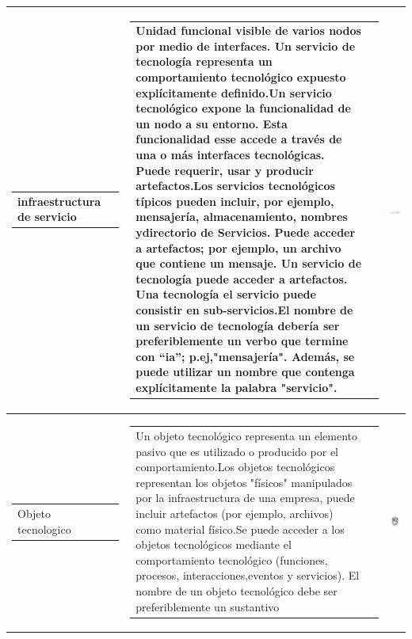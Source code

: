 \begin{longtable}{|c|c|c|}
	\begin{tabular}{p{2cm}p{3cm}}
		infraestructura de servicio  
	\end{tabular}
	&
	\begin{tabular}{p{8cm}p{3cm}} 
		Unidad funcional visible de varios nodos por medio de interfaces.
		Un servicio de tecnología representa un comportamiento tecnológico expuesto explícitamente definido.Un servicio tecnológico expone la funcionalidad de un nodo a su entorno. Esta funcionalidad esse accede a través de una o más interfaces tecnológicas. Puede requerir, usar y producir artefactos.Los servicios tecnológicos típicos pueden incluir, por ejemplo, mensajería, almacenamiento, nombres ydirectorio de Servicios. Puede acceder a artefactos; por ejemplo, un archivo que contiene un mensaje. Un servicio de tecnología puede acceder a artefactos. Una tecnología el servicio puede consistir en sub-servicios.El nombre de un servicio de tecnología debería ser preferiblemente un verbo que termine con “ia”; p.ej,"mensajería". Además, se puede utilizar un nombre que contenga explícitamente la palabra "servicio".
	\end{tabular} 
	& \includegraphics[width=0.2\linewidth, height=0.05\textheight]{imgs/conceptos/tecnologica/servicioTecnologia}
	\\
	\hline
	
	
	\begin{tabular}{p{2cm}p{3cm}}
		Objeto tecnologico
	\end{tabular}
	&
	\begin{tabular}{p{8cm}p{3cm}} 
		Un objeto tecnológico representa un elemento pasivo que es utilizado o producido por el comportamiento.Los objetos tecnológicos representan los objetos "físicos" manipulados por la infraestructura de una empresa, puede incluir artefactos (por ejemplo, archivos) como material físico.Se puede acceder a los objetos tecnológicos mediante el comportamiento tecnológico (funciones, procesos, interacciones,eventos y servicios). El nombre de un objeto tecnológico debe ser preferiblemente un sustantivo
	\end{tabular}
	& \includegraphics[width=0.2\linewidth, height=0.05\textheight]{imgs/conceptos/tecnologica/Ud}
	\\
	\hline
	

\end{longtable}

